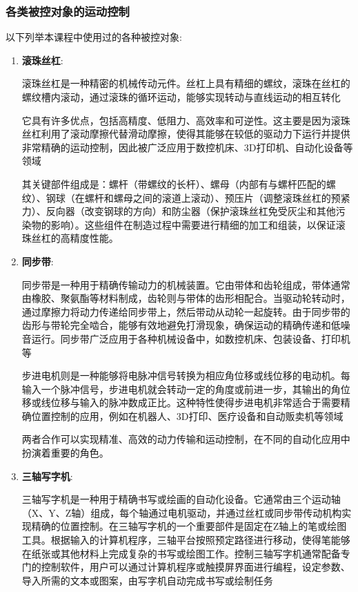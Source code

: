 \documentclass{article}
\begin{document}
\subsubsection{各类被控对象的运动控制}
以下列举本课程中使用过的各种被控对象:\par
\begin{enumerate}
\item \textbf{滚珠丝杠}:\par
\qquad 滚珠丝杠是一种精密的机械传动元件。丝杠上具有精细的螺纹，滚珠在丝杠的螺纹槽内滚动，通过滚珠的循环运动，能够实现转动与直线运动的相互转化\par
它具有许多优点，包括高精度、低阻力、高效率和可逆性。这主要是因为滚珠丝杠利用了滚动摩擦代替滑动摩擦，使得其能够在较低的驱动力下运行并提供非常精确的运动控制，因此被广泛应用于数控机床、3D打印机、自动化设备等领域\par
其关键部件组成是：螺杆（带螺纹的长杆）、螺母（内部有与螺杆匹配的螺纹）、钢球（在螺杆和螺母之间的滚道上滚动）、预压片（调整滚珠丝杠的预紧力）、反向器（改变钢球的方向）和防尘器（保护滚珠丝杠免受灰尘和其他污染物的影响）。这些组件在制造过程中需要进行精细的加工和组装，以保证滚珠丝杠的高精度性能。
\item \textbf{同步带}:\par
\qquad 同步带是一种用于精确传输动力的机械装置。它由带体和齿轮组成，带体通常由橡胶、聚氨酯等材料制成，齿轮则与带体的齿形相配合。当驱动轮转动时，通过摩擦力将动力传递给同步带上，然后带动从动轮一起旋转。由于同步带的齿形与带轮完全啮合，能够有效地避免打滑现象，确保运动的精确传递和低噪音运行。同步带广泛应用于各种机械设备中，如数控机床、包装设备、打印机等\par
\qquad 步进电机则是一种能够将电脉冲信号转换为相应角位移或线位移的电动机。每输入一个脉冲信号，步进电机就会转动一定的角度或前进一步，其输出的角位移或线位移与输入的脉冲数成正比。这种特性使得步进电机非常适合于需要精确位置控制的应用，例如在机器人、3D打印、医疗设备和自动贩卖机等领域\par
\qquad 两者合作可以实现精准、高效的动力传输和运动控制，在不同的自动化应用中扮演着重要的角色。
\item \textbf{三轴写字机}:\par
\qquad 三轴写字机是一种用于精确书写或绘画的自动化设备。它通常由三个运动轴（X、Y、Z轴）组成，每个轴通过电机驱动，并通过丝杠或同步带传动机构实现精确的位置控制。在三轴写字机的一个重要部件是固定在Z轴上的笔或绘图工具。根据输入的计算机程序，三轴平台按照预定路径进行移动，使得笔能够在纸张或其他材料上完成复杂的书写或绘图工作。控制三轴写字机通常配备专门的控制软件，用户可以通过计算机程序或触摸屏界面进行编程，设定参数、导入所需的文本或图案，由写字机自动完成书写或绘制任务\par

\end{enumerate}
\end{document}
